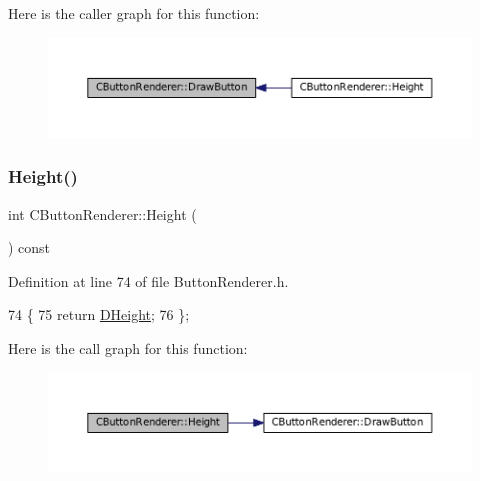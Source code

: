 Here is the caller graph for this function\+:\nopagebreak
\begin{figure}[H]
\begin{center}
\leavevmode
\includegraphics[width=350pt]{classCButtonRenderer_a9f29dd6d2243ddae58211706cc6b37b6_icgraph}
\end{center}
\end{figure}
\hypertarget{classCButtonRenderer_aecdea7c8978a3d0fb27f3a7bf49d8387}{}\label{classCButtonRenderer_aecdea7c8978a3d0fb27f3a7bf49d8387} 
\subsubsection{\texorpdfstring{Height()}{Height()}\hspace{0.1cm}{\footnotesize\ttfamily [1/2]}}
{\footnotesize\ttfamily int C\+Button\+Renderer\+::\+Height (\begin{DoxyParamCaption}{ }\end{DoxyParamCaption}) const\hspace{0.3cm}{\ttfamily [inline]}}



Definition at line 74 of file Button\+Renderer.\+h.


\begin{DoxyCode}
74                           \{
75             \textcolor{keywordflow}{return} \hyperlink{classCButtonRenderer_a7e3d605b90c45d87ac1396c23c90b250}{DHeight};    
76         \};
\end{DoxyCode}
Here is the call graph for this function\+:\nopagebreak
\begin{figure}[H]
\begin{center}
\leavevmode
\includegraphics[width=350pt]{classCButtonRenderer_aecdea7c8978a3d0fb27f3a7bf49d8387_cgraph}
\end{center}
\end{figure}
\hypertarget{classCButtonRenderer_addba56a5d490f33010c919020e67a376}{}\label{classCButtonRenderer_addba56a5d490f33010c919020e67a376} 
